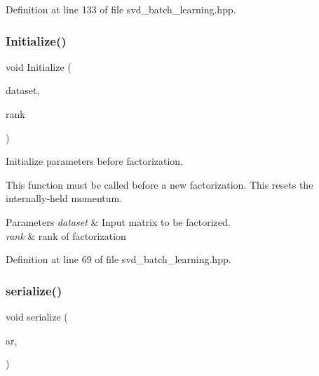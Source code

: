 Definition at line 133 of file svd\+\_\+batch\+\_\+learning.\+hpp.

\mbox{\label{classmlpack_1_1amf_1_1SVDBatchLearning_a1af73fa03a54127db8d2bbc558a58c4c}} 
\subsubsection{Initialize()}
{\footnotesize\ttfamily void Initialize (\begin{DoxyParamCaption}\item[{const Mat\+Type \&}]{dataset,  }\item[{const size\+\_\+t}]{rank }\end{DoxyParamCaption})\hspace{0.3cm}{\ttfamily [inline]}}



Initialize parameters before factorization. 

This function must be called before a new factorization. This resets the internally-\/held momentum.


\begin{DoxyParams}{Parameters}
{\em dataset} & Input matrix to be factorized. \\
\hline
{\em rank} & rank of factorization \\
\hline
\end{DoxyParams}


Definition at line 69 of file svd\+\_\+batch\+\_\+learning.\+hpp.

\mbox{\label{classmlpack_1_1amf_1_1SVDBatchLearning_a65cba07328997659bec80b9879b15a51}} 
\subsubsection{serialize()}
{\footnotesize\ttfamily void serialize (\begin{DoxyParamCaption}\item[{Archive \&}]{ar,  }\item[{const uint32\+\_\+t}]{ }\end{DoxyParamCaption})\hspace{0.3cm}{\ttfamily [inline]}}



